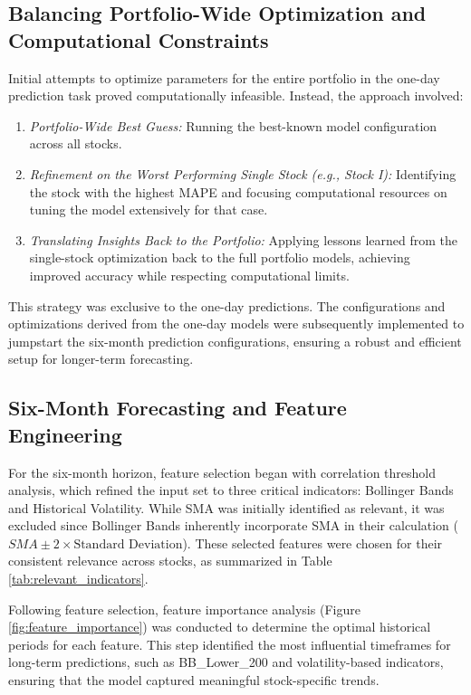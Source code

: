 \documentclass[10pt,twocolumn]{article}
\begin{document}
\subsection{Balancing Portfolio-Wide Optimization and Computational Constraints}

Initial attempts to optimize parameters for the entire portfolio in the one-day prediction task proved computationally infeasible. Instead, the approach involved:

\begin{enumerate}
    \item \textit{Portfolio-Wide Best Guess:} Running the best-known model configuration across all stocks.
    \item \textit{Refinement on the Worst Performing Single Stock (e.g., Stock I):} Identifying the stock with the highest MAPE and focusing computational resources on tuning the model extensively for that case.
    \item \textit{Translating Insights Back to the Portfolio:} Applying lessons learned from the single-stock optimization back to the full portfolio models, achieving improved accuracy while respecting computational limits.
\end{enumerate}

This strategy was exclusive to the one-day predictions. The configurations and optimizations derived from the one-day models were subsequently implemented to jumpstart the six-month prediction configurations, ensuring a robust and efficient setup for longer-term forecasting.

\subsection{Six-Month Forecasting and Feature Engineering}

For the six-month horizon, feature selection began with correlation threshold analysis, which refined the input set to three critical indicators: Bollinger Bands and Historical Volatility. While SMA was initially identified as relevant, it was excluded since Bollinger Bands inherently incorporate SMA in their calculation (\(SMA \pm 2 \times \text{Standard Deviation}\)). These selected features were chosen for their consistent relevance across stocks, as summarized in Table \ref{tab:relevant_indicators}.

Following feature selection, feature importance analysis (Figure \ref{fig:feature_importance}) was conducted to determine the optimal historical periods for each feature. This step identified the most influential timeframes for long-term predictions, such as BB\_Lower\_200 and volatility-based indicators, ensuring that the model captured meaningful stock-specific trends.
\end{document}
